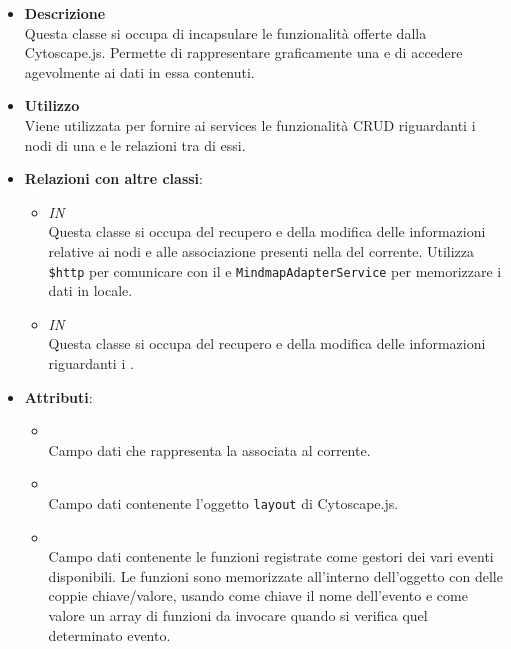 \FloatBarrier
\begin{itemize}
\item \textbf{Descrizione}\\
Questa classe si occupa di incapsulare le funzionalità offerte dalla  Cytoscape.js. Permette di rappresentare graficamente una  e di accedere agevolmente ai dati in essa contenuti.
\item \textbf{Utilizzo}\\
Viene utilizzata per fornire ai services le funzionalità CRUD riguardanti i nodi di una  e le relazioni tra di essi.
\item \textbf{Relazioni con altre classi}:
\begin{itemize}
\item \textit{IN} \hyperref[\nogloxy{Premi::Front-End::Services::MindmapService}]{}\\
Questa classe si occupa del recupero e della modifica delle informazioni relative ai nodi e alle associazione presenti nella  del  corrente. Utilizza \texttt{\$http} per comunicare con il  e \texttt{MindmapAdapterService} per memorizzare i dati in locale.
\item \textit{IN} \hyperref[\nogloxy{Premi::Front-End::Services::ProjectService}]{}\\
Questa classe si occupa del recupero e della modifica delle informazioni riguardanti i .
\end{itemize}
\item \textbf{Attributi}:
\begin{itemize}
\item {}
\\ Campo dati che rappresenta la  associata al  corrente.
\item {}
\\ Campo dati contenente l'oggetto \texttt{layout} di Cytoscape.js.
\item {}
\\ Campo dati contenente le funzioni registrate come gestori dei vari eventi disponibili. Le funzioni sono memorizzate all'interno dell'oggetto con delle coppie chiave/valore, usando come chiave il nome dell'evento e come valore un array di funzioni da invocare quando si verifica quel determinato evento.

\end{itemize}
\end{itemize}
